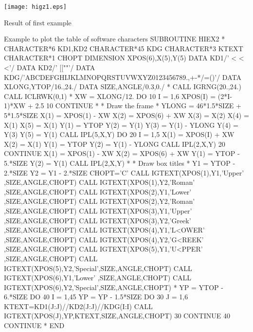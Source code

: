 \begin{minipage}{\textwidth}
\begin{Fighere}
\begin{center}\texttt{[image: higz1.eps]}\end{center}
\caption{Result of first \protect\HIGZ{} example}
\end{Fighere}
\end{minipage}

\newpage

\begin{XMPt}{Example to plot the table of \HIGZ{} software characters}
      SUBROUTINE HIEX2
*
      CHARACTER*6 KD1,KD2
      CHARACTER*45 KDG
      CHARACTER*3 KTEXT
      CHARACTER*1 CHOPT
      DIMENSION XPOS(6),X(5),Y(5)
      DATA KD1/' < < <'/
      DATA KD2/'  [[""'/
      DATA KDG/'ABCDEFGHIJKLMNOPQRSTUVWXYZ0123456789.,+-*/=()'/
      DATA XLONG,YTOP/16.,24./
      DATA SIZE,ANGLE/0.3,0./
*
      CALL IGRNG(20.,24.)
      CALL ICLRWK(0,1)
*
      XW = XLONG/12.
      DO 10 I = 1,6
         XPOS(I) = (2*I-1)*XW + 2.5
  10  CONTINUE
*
*              Draw the frame
*
      YLONG  = 46*1.5*SIZE + 5*1.5*SIZE
      X(1)   = XPOS(1) - XW
      X(2)   = XPOS(6) + XW
      X(3)   = X(2)
      X(4)   = X(1)
      X(5)   = X(1)
      Y(1)   = YTOP
      Y(2)   = Y(1)
      Y(3)   = Y(1) - YLONG
      Y(4)   = Y(3)
      Y(5)   = Y(1)
      CALL IPL(5,X,Y)
      DO 20 I = 1,5
         X(1)   = XPOS(I) + XW
         X(2)   = X(1)
         Y(1)   = YTOP
         Y(2)   = Y(1) - YLONG
         CALL IPL(2,X,Y)
  20  CONTINUE
      X(1)   = XPOS(1) - XW
      X(2)   = XPOS(6) + XW
      Y(1)   = YTOP - 5.*SIZE
      Y(2)   = Y(1)
      CALL IPL(2,X,Y)
*
*             Draw box titles
*
      Y1     = YTOP - 2.*SIZE
      Y2     = Y1 - 2.*SIZE
      CHOPT='C'
      CALL IGTEXT(XPOS(1),Y1,'Upper'  ,SIZE,ANGLE,CHOPT)
      CALL IGTEXT(XPOS(1),Y2,'Roman'  ,SIZE,ANGLE,CHOPT)
      CALL IGTEXT(XPOS(2),Y1,'Lower'  ,SIZE,ANGLE,CHOPT)
      CALL IGTEXT(XPOS(2),Y2,'Roman'  ,SIZE,ANGLE,CHOPT)
      CALL IGTEXT(XPOS(3),Y1,'Upper'  ,SIZE,ANGLE,CHOPT)
      CALL IGTEXT(XPOS(3),Y2,'Greek'  ,SIZE,ANGLE,CHOPT)
      CALL IGTEXT(XPOS(4),Y1,'L<OWER' ,SIZE,ANGLE,CHOPT)
      CALL IGTEXT(XPOS(4),Y2,'G<REEK' ,SIZE,ANGLE,CHOPT)
      CALL IGTEXT(XPOS(5),Y1,'U<PPER' ,SIZE,ANGLE,CHOPT)
      CALL IGTEXT(XPOS(5),Y2,'Special',SIZE,ANGLE,CHOPT)
      CALL IGTEXT(XPOS(6),Y1,'Lower'  ,SIZE,ANGLE,CHOPT)
      CALL IGTEXT(XPOS(6),Y2,'Special',SIZE,ANGLE,CHOPT)
*
      YP = YTOP - 6.*SIZE
      DO 40 I = 1,45
         YP = YP - 1.5*SIZE
         DO 30 J = 1,6
            KTEXT=KD1(J:J)//KD2(J:J)//KDG(I:I)
            CALL IGTEXT(XPOS(J),YP,KTEXT,SIZE,ANGLE,CHOPT)
  30     CONTINUE
  40  CONTINUE
*
      END
\end{XMPt}

